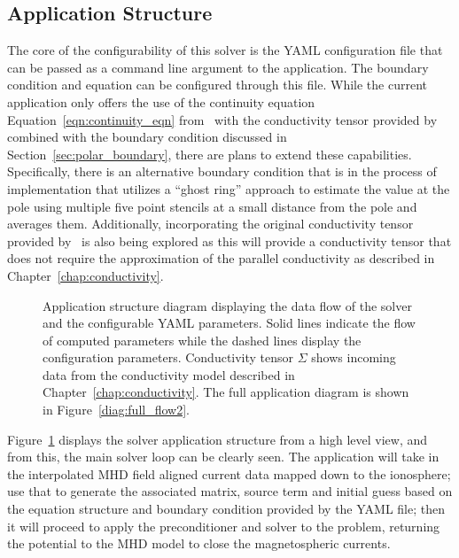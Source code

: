 \subsection{Application Structure}
\label{sec:application_structure}
The core of the configurability of this solver is the YAML configuration file that can be passed as a command line argument to the application. The boundary condition and equation can be configured through this file. While the current application only offers the use of the continuity equation Equation~\ref{eqn:continuity_eqn} from~\citet{goodman1995} with the conductivity tensor provided by~\citet{amm1996} combined with the boundary condition discussed in Section~\ref{sec:polar_boundary}, there are plans to extend these capabilities. Specifically, there is an alternative boundary condition that is in the process of implementation that utilizes a ``ghost ring'' approach to estimate the value at the pole using multiple five point stencils at a small distance from the pole and averages them. Additionally, incorporating the original conductivity tensor provided by~\citet{goodman1995} is also being explored as this will provide a conductivity tensor that does not require the approximation of the parallel conductivity as described in Chapter~\ref{chap:conductivity}.

\begin{figure}[htbp]
	\centering
	
	\caption{Application structure diagram displaying the data flow of the solver and the configurable YAML parameters. Solid lines indicate the flow of computed parameters while the dashed lines display the configuration parameters. Conductivity tensor $\Sigma$ shows incoming data from the conductivity model described in Chapter~\ref{chap:conductivity}. The full application diagram is shown in Figure~\ref{diag:full_flow2}.}
	\label{diag:solver_flow}
\end{figure}
Figure~\ref{diag:solver_flow} displays the solver application structure from a high level view, and from this, the main solver loop can be clearly seen. The application will take in the interpolated MHD field aligned current data mapped down to the ionosphere; use that to generate the associated matrix, source term and initial guess based on the equation structure and boundary condition provided by the YAML file; then it will proceed to apply the preconditioner and solver to the problem, returning the potential to the MHD model to close the magnetospheric currents.

